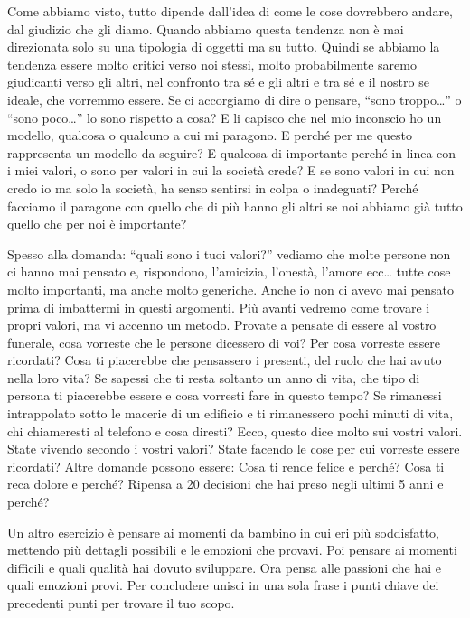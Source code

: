 \documentclass[12pt]{book} %
\begin{document}
Come abbiamo visto, tutto dipende dall'idea di come le cose dovrebbero andare, dal giudizio che gli
diamo. Quando abbiamo questa tendenza non è mai direzionata solo su una tipologia di oggetti ma su tutto. Quindi se
abbiamo la tendenza essere molto critici verso noi stessi, molto probabilmente saremo giudicanti verso gli altri, nel
confronto tra sé e gli altri e tra sé e il nostro se ideale, che vorremmo essere. Se ci accorgiamo di dire o pensare,
“sono troppo…” o “sono poco…” lo sono rispetto a cosa? E li capisco che nel mio inconscio ho un modello, qualcosa o
qualcuno a cui mi paragono. E perché per me questo rappresenta un modello da seguire? E qualcosa di importante perché
in linea con i miei valori, o sono per valori in cui la società crede? E se sono valori in cui non credo io ma solo la
società, ha senso sentirsi in colpa o inadeguati? Perché facciamo il paragone con quello che di più hanno gli altri se
noi abbiamo già tutto quello che per noi è importante?

Spesso alla domanda: “quali sono i tuoi valori?” vediamo che molte persone non ci hanno mai pensato e, rispondono,
l'amicizia, l'onestà, l'amore ecc… tutte cose molto
importanti, ma anche molto generiche. Anche io non ci avevo mai pensato prima di imbattermi in questi argomenti. Più
avanti vedremo come trovare i propri valori, ma vi accenno un metodo. Provate a pensate di essere al vostro funerale,
cosa vorreste che le persone dicessero di voi? Per cosa vorreste essere ricordati? Cosa ti piacerebbe che pensassero i
presenti, del ruolo che hai avuto nella loro vita? Se sapessi che ti resta soltanto un anno di vita, che tipo di
persona ti piacerebbe essere e cosa vorresti fare in questo tempo? Se rimanessi intrappolato sotto le macerie di un
edificio e ti rimanessero pochi minuti di vita, chi chiameresti al telefono e cosa diresti? Ecco, questo dice molto sui
vostri valori. State vivendo secondo i vostri valori? State facendo le cose per cui vorreste essere ricordati?
Altre domande possono essere:
Cosa ti rende felice e perché?
Cosa ti reca dolore e perché?
Ripensa a 20 decisioni che hai preso negli ultimi 5 anni e perché?

Un altro esercizio è pensare ai momenti da bambino in cui eri più soddisfatto, mettendo più dettagli possibili e le
emozioni che provavi. Poi pensare ai momenti difficili e quali qualità hai dovuto sviluppare. Ora pensa alle passioni
che hai e quali emozioni provi. Per concludere unisci in una sola frase i punti chiave dei precedenti punti per trovare
il tuo scopo.
\end{document}
